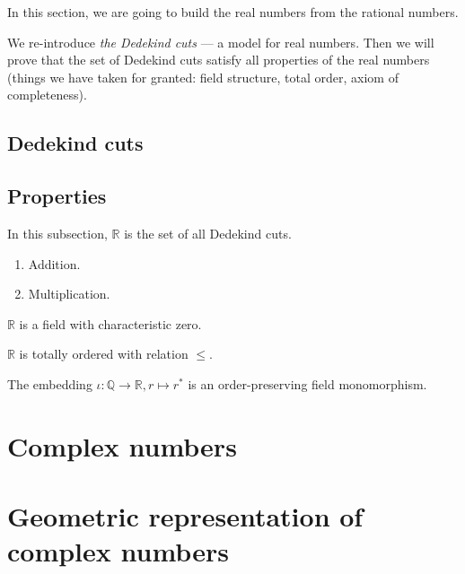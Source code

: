 \documentclass[class=mike-apostol-mathematical-analysis,crop=false]{standalone}
\begin{document}
\par In this section, we are going to build the real numbers from the rational numbers.

\par We re-introduce \textit{the Dedekind cuts} --- a model for real numbers. Then we will prove that the set of Dedekind cuts satisfy all properties of the real numbers (things we have taken for granted: field structure, total order, axiom of completeness).

\subsection*{Dedekind cuts}

\subsection*{Properties}

\par In this subsection, $\mathbb{R}$ is the set of all Dedekind cuts.

\begin{definition}
    \begin{enumerate}
        \item Addition.
        \item Multiplication.
    \end{enumerate}
\end{definition}

\begin{theorem}
    $\mathbb{R}$ is a field with characteristic zero.
\end{theorem}

\begin{theorem}
    $\mathbb{R}$ is totally ordered with relation $\leq$.
\end{theorem}

\begin{theorem}
    The embedding $\iota: \mathbb{Q} \to \mathbb{R}, r \mapsto {r}^{*}$ is an order-preserving field monomorphism.
\end{theorem}

\section{Complex numbers}

\section{Geometric representation of complex numbers}
\end{document}
